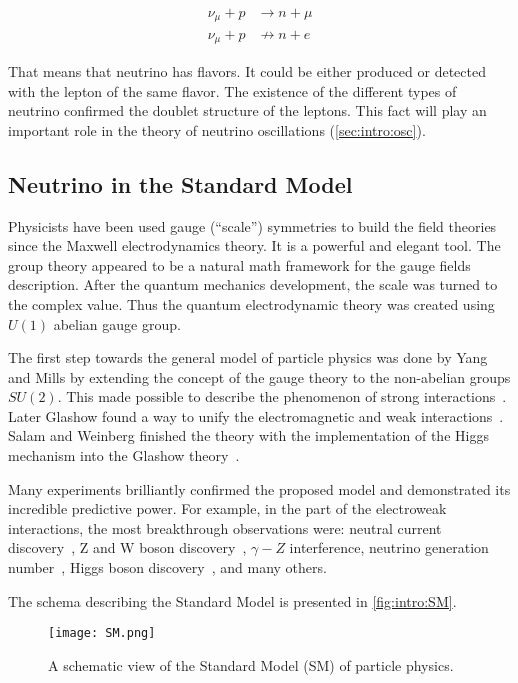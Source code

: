 \documentclass[../main.tex]{subfiles}
\begin{document}
\begin{align}
\label{eq:allowed}
\nu_\mu+p&\rightarrow n+\mu \\
\nu_\mu+p&\nrightarrow n+e
\label{eq:notallowed}
\end{align}

That means that neutrino has flavors. It could be either produced or detected with the lepton of the same flavor. The existence of the different types of neutrino confirmed the doublet structure of the leptons. This fact will play an important role in the theory of neutrino oscillations (\autoref{sec:intro:osc}).

\subsection{Neutrino in the Standard Model}
\label{sec:sm}

Physicists have been used gauge (``scale'') symmetries to build the field theories since the Maxwell electrodynamics theory. It is a powerful and elegant tool. The group theory appeared to be a natural math framework for the gauge fields description. After the quantum mechanics development, the scale was turned to the complex value. Thus the quantum electrodynamic theory was created using $U(1)$ abelian gauge group.

The first step towards the general model of particle physics was done by Yang and Mills by extending the concept of the gauge theory to the non-abelian groups $SU(2)$. This made possible to describe the phenomenon of strong interactions~\cite{Yang1954}. Later Glashow found a way to unify the electromagnetic and weak interactions~\cite{Glashow1961}. Salam and Weinberg finished the theory with the implementation of the Higgs mechanism into the Glashow theory~\cite{Weinberg1967}.

Many experiments brilliantly confirmed the proposed model and demonstrated its incredible predictive power. For example, in the part of the electroweak interactions, the most breakthrough observations were: neutral current discovery~\cite{Cundy1974}, Z and W boson discovery~\cite{Arnison1983}, $\gamma-Z$ interference, neutrino generation number~\cite{Arnison1983}, Higgs boson discovery~\cite{Aad2012}, and many others.

The schema describing the Standard Model is presented in \autoref{fig:intro:SM}.

\begin{figure}[!ht]
    \centering
    \texttt{[image: SM.png]}
    \caption{A schematic view of the Standard Model (SM) of particle physics.}
    \label{fig:intro:SM}
\end{figure}
\end{document}
